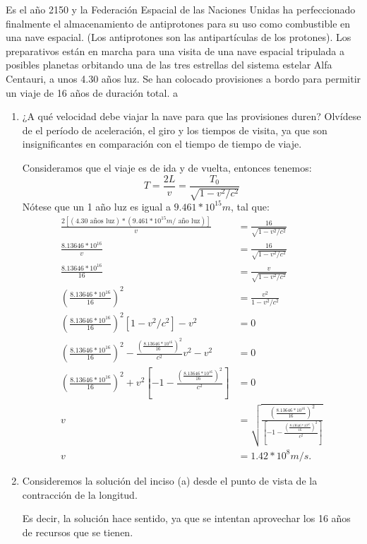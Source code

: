 \begin{problema}
    Es el año 2150 y la Federación Espacial de las Naciones Unidas ha perfeccionado finalmente el almacenamiento de antiprotones para su uso como combustible en una nave espacial. (Los antiprotones son las antipartículas de los protones). Los preparativos están en marcha para una visita de una nave espacial tripulada a posibles planetas orbitando una de las tres estrellas del sistema estelar Alfa Centauri, a unos 4.30 años luz. Se han colocado provisiones a bordo para permitir un viaje de 16 años de duración total. a
    \begin{enumerate}
        \item ¿A qué velocidad debe viajar la nave para que las provisiones duren? Olvídese de el período de aceleración, el giro y los tiempos de visita, ya que son insignificantes en comparación con el tiempo de tiempo de viaje. 
        \begin{sol}
            Consideramos que el viaje es de ida y de vuelta, entonces tenemos:
            $$T= \frac{2L}{v} = \frac{T_0}{\sqrt{1-v^2/c^2}}$$
            Nótese que un 1 año luz es igual a $9.461*10^{15} m$, tal que:
            \begin{align*}
                 \frac{2\left[ (4.30 \text{ años luz}) * (9.461*10^{15} m/\text{ año luz})\right]}{v} &= \frac{16}{\sqrt{1-v^2/c^2}}\\
                 \frac{8.13646*10^{16}}{v} &= \frac{16}{\sqrt{1-v^2/c^2}}\\
                 \frac{8.13646*10^{16}}{16} &= \frac{v}{\sqrt{1-v^2/c^2}}\\
                 \left(\frac{8.13646*10^{16}}{16}\right)^2 &= \frac{v^2}{1-v^2/c^2}\\
                 \left(\frac{8.13646*10^{16}}{16}\right)^2\left[ 1- v^2/c^2\right] -v^2&= 0\\
                 \left(\frac{8.13646*10^{16}}{16}\right)^2 - \frac{\left(\frac{8.13646*10^{16}}{16}\right)^2}{c^2}v^2-v^2&= 0\\
                 \left(\frac{8.13646*10^{16}}{16}\right)^2 + v^2\left[-1-\frac{\left(\frac{8.13646*10^{16}}{16}\right)^2}{c^2}\right]&= 0\\
                 v&=\sqrt{\frac{\left(\frac{8.13646*10^{16}}{16}\right)^2 }{\left[-1-\frac{\left(\frac{8.13646*10^{16}}{16}\right)^2}{c^2}\right]}}\\
                 v&= 1.42*10^8 m/s.
            \end{align*}
        \end{sol}
        \item Consideremos la solución del inciso (a) desde el punto de vista de la contracción de la longitud. 
        \begin{sol}
            Es decir, la solución hace sentido, ya que se intentan aprovechar los 16 años de recursos que se tienen. 
        \end{sol}
    \end{enumerate}
\end{problema}

